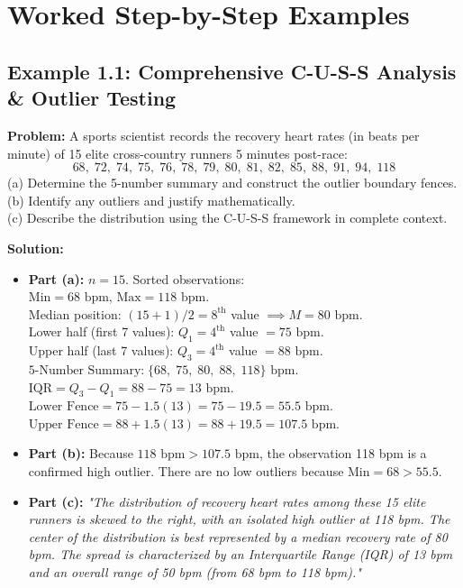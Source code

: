 \section{Worked Step-by-Step Examples}

\subsection*{Example 1.1: Comprehensive C-U-S-S Analysis & Outlier Testing}
\textbf{Problem:} A sports scientist records the recovery heart rates (in beats per minute) of 15 elite cross-country runners 5 minutes post-race:
\[ 68, \; 72, \; 74, \; 75, \; 76, \; 78, \; 79, \; 80, \; 81, \; 82, \; 85, \; 88, \; 91, \; 94, \; 118 \]
(a) Determine the 5-number summary and construct the outlier boundary fences.\\
(b) Identify any outliers and justify mathematically.\\
(c) Describe the distribution using the C-U-S-S framework in complete context.

\textbf{Solution:}
\begin{itemize}[leftmargin=1.2em]
  \item \textbf{Part (a):} $n = 15$. Sorted observations:\\
  $\text{Min} = 68\text{ bpm}$, $\text{Max} = 118\text{ bpm}$.\\
  Median position: $(15+1)/2 = 8^{\text{th}}$ value $\implies M = 80\text{ bpm}$.\\
  Lower half (first 7 values): $Q_1 = 4^{\text{th}}$ value $= 75\text{ bpm}$.\\
  Upper half (last 7 values): $Q_3 = 4^{\text{th}}$ value $= 88\text{ bpm}$.\\
  $\text{5-Number Summary:} \; \{68, \; 75, \; 80, \; 88, \; 118\}\text{ bpm}$.\\
  $\text{IQR} = Q_3 - Q_1 = 88 - 75 = 13\text{ bpm}$.\\
  $\text{Lower Fence} = 75 - 1.5(13) = 75 - 19.5 = 55.5\text{ bpm}$.\\
  $\text{Upper Fence} = 88 + 1.5(13) = 88 + 19.5 = 107.5\text{ bpm}$.
  \item \textbf{Part (b):} Because $118\text{ bpm} > 107.5\text{ bpm}$, the observation 118 bpm is a confirmed high outlier. There are no low outliers because $\text{Min} = 68 > 55.5$.
  \item \textbf{Part (c):}
  \textit{"The distribution of recovery heart rates among these 15 elite runners is skewed to the right, with an isolated high outlier at 118 bpm. The center of the distribution is best represented by a median recovery rate of 80 bpm. The spread is characterized by an Interquartile Range (IQR) of 13 bpm and an overall range of 50 bpm (from 68 bpm to 118 bpm)."}
\end{itemize}

